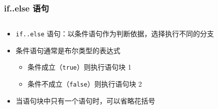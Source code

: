 \begin{frame}[fragile]
    \frametitle{if..else 语句}

    \begin{columns}
        \begin{overlayarea}{\textwidth}{.6\textheight}
            \begin{itemize}
                \item \lstinline|if..else| 语句：以条件语句作为判断依据，选择执行不同的分支

                \item 条件语句通常是布尔类型的表达式

                    \begin{itemize}
                        \item<2-> 条件成立（\lstinline|true|）则执行语句块 1
                        \item<3-> 条件不成立（\lstinline|false|）则执行语句块 2
                    \end{itemize}

                \item<4-> 当语句块中只有一个语句时，可以省略花括号
            \end{itemize}
        \end{overlayarea}

        \begin{overlayarea}{\textwidth}{.3\textheight}
            
        \end{overlayarea}
    \end{columns}
\end{frame}

